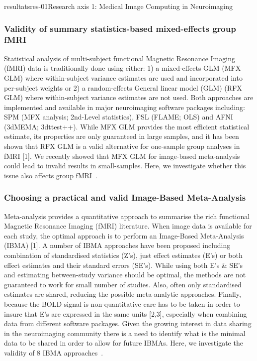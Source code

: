 \documentclass{ra2018}
\begin{document}
\begin{module}{resultats}{res-01}{Research axis 1: Medical Image Computing in Neuroimaging}
\subsubsection{Validity of summary statistics-based mixed-effects group fMRI}
\begin{participants}
\end{participants}
Statistical analysis of multi-subject functional Magnetic Resonance Imaging (fMRI) data is traditionally done using either: 1) a mixed-effects GLM (MFX GLM) where within-subject variance estimates are used and incorporated into per-subject weights or 2) a random-effects General linear model (GLM) (RFX GLM) where within-subject variance estimates are not used. Both approaches are implemented and available in major neuroimaging software packages including: SPM (MFX analysis; 2nd-Level statistics), FSL (FLAME; OLS) and AFNI (3dMEMA; 3dttest++). While MFX GLM provides the most efficient statistical estimate, its properties are only guaranteed in large samples, and it has been shown that RFX GLM is a valid alternative for one-sample group analyses in fMRI [1]. We recently showed that MFX GLM for image-based meta-analysis could lead to invalid results in small-samples. Here, we investigate whether this issue also affects group fMRI~\cite{maumet:inserm-01887911}.

\subsubsection{Choosing a practical and valid Image-Based Meta-Analysis}
\begin{participants}
\end{participants}
Meta-analysis provides a quantitative approach to summarise the rich functional Magnetic Resonance Imaging (fMRI) literature. When image data is available for each study, the optimal approach is to perform an Image-Based Meta-Analysis (IBMA) [1]. A number of IBMA approaches have been proposed including combination of standardised statistics (Z's), just effect estimates (E's) or both effect estimates and their standard errors (SE's). While using both E’s \& SE’s and estimating between-study variance should be optimal, the methods are not guaranteed to work for small number of studies. Also, often only standardised estimates are shared, reducing the possible meta-analytic approaches. Finally, because the BOLD signal is non-quantitative care has to be taken in order to insure that E's are expressed in the same units [2,3], especially when combining data from different software packages. Given the growing interest in data sharing in the neuroimaging community there is a need to identify what is the minimal data to be shared in order to allow for future IBMAs. Here, we investigate the validity of 8 IBMA approaches~\cite{maumet:inserm-01933032}.


\end{module}
\end{document}
